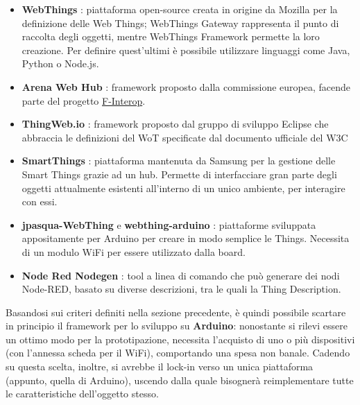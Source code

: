 \documentclass[12pt,a4paper,openright,oneside]{report}
\begin{document}
\begin{itemize}
	
	\item \textbf{WebThings} \cite{webthings}: piattaforma open-source creata in origine da Mozilla per la definizione delle Web Things; WebThings Gateway rappresenta il punto di raccolta degli oggetti, mentre WebThings Framework permette la loro creazione. Per definire quest'ultimi è possibile utilizzare linguaggi come Java, Python o Node.js.
	
	\item \textbf{Arena Web Hub} \cite{arenawh}: framework proposto dalla commissione europea, facende parte del progetto \href{https://www.f-interop.eu/}{F-Interop}.
	
	
	\item \textbf{ThingWeb.io} \cite{thingweb}: framework proposto dal gruppo di sviluppo Eclipse che abbraccia le definizioni del WoT specificate dal documento ufficiale del W3C
	
	
	\item \textbf{SmartThings} \cite{smartthings}: piattaforma mantenuta da Samsung per la gestione delle Smart Things grazie ad un hub. Permette di interfacciare gran parte degli oggetti attualmente esistenti all'interno di un unico ambiente, per interagire con essi.
	
	\item \textbf{jpasqua-WebThing} \cite{jpasqua} e \textbf{webthing-arduino} \cite{wtarduino}: piattaforme sviluppata appositamente per Arduino per creare in modo semplice le Things. Necessita di un modulo WiFi per essere utilizzato dalla board.
	
	\item \textbf{Node Red Nodegen} \cite{nodered}: tool a linea di comando che può generare dei nodi Node-RED, basato su diverse descrizioni, tra le quali la Thing Description.
\end{itemize}


Basandosi sui criteri definiti nella sezione precedente, è quindi possibile scartare in principio il framework per lo sviluppo su \textbf{Arduino}: nonostante si rilevi essere un ottimo modo per la prototipazione, necessita l'acquisto di uno o più dispositivi (con l'annessa scheda per il WiFi), comportando una spesa non banale. Cadendo su questa scelta, inoltre, si avrebbe il lock-in verso un unica piattaforma (appunto, quella di Arduino), uscendo dalla quale bisognerà reimplementare tutte le caratteristiche dell'oggetto stesso.\\
\end{document}
